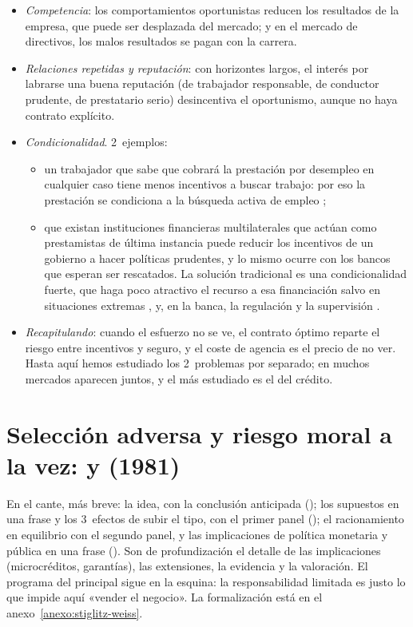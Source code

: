 \documentclass[11pt]{article}
\begin{document}
\begin{itemize}
\item \emph{Competencia}: los comportamientos oportunistas reducen los resultados de la empresa, que puede ser desplazada del mercado; y en el mercado de directivos, los malos resultados se pagan con la carrera.
\item \emph{Relaciones repetidas y reputación}: con horizontes largos, el interés por labrarse una buena reputación (de trabajador responsable, de conductor prudente, de prestatario serio) desincentiva el oportunismo, aunque no haya contrato explícito\nocite{Holmstrom1999Managerial}.
\item \emph{Condicionalidad}. 2~ejemplos:
  \begin{itemize}
  \item un trabajador que sabe que cobrará la prestación por desempleo en cualquier caso tiene menos incentivos a buscar trabajo: por eso la prestación se condiciona a la búsqueda activa de empleo ;
  \item que existan instituciones financieras multilaterales que actúan como prestamistas de última instancia puede reducir los incentivos de un gobierno a hacer políticas prudentes, y lo mismo ocurre con los bancos que esperan ser rescatados. La solución tradicional es una condicionalidad fuerte, que haga poco atractivo el recurso a esa financiación salvo en situaciones extremas , y, en la banca, la regulación y la supervisión .
  \end{itemize}
\item \emph{Recapitulando}: cuando el esfuerzo no se ve, el contrato óptimo reparte el riesgo entre incentivos y seguro, y el coste de agencia es el precio de no ver. Hasta aquí hemos estudiado los 2~problemas por separado; en muchos mercados aparecen juntos, y el más estudiado es el del crédito.
\end{itemize}

\section{Selección adversa y riesgo moral a la vez:\cortetitulo{}  y  (1981)}\label{sec:sa-rm-a-la-vez}

\begin{notaopositor}
En el cante, más breve: la idea, con la conclusión anticipada (); los supuestos en una frase y los 3~efectos de subir el tipo, con el primer panel (); el racionamiento en equilibrio con el segundo panel, y las implicaciones de política monetaria y pública en una frase (). Son de profundización el detalle de las implicaciones (microcréditos, garantías), las extensiones, la evidencia y la valoración. El programa del principal sigue en la esquina: la responsabilidad limitada es justo lo que impide aquí «vender el negocio». La formalización está en el anexo~\ref{anexo:stiglitz-weiss}.
\end{notaopositor}
\end{document}
